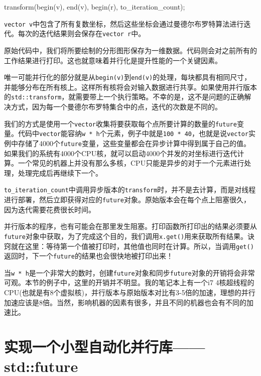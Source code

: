 \begin{codebox}[cpp]
transform(begin(v), end(v), begin(r), to_iteration_count);
\end{codebox}

\texttt{vector v}中包含了所有复数坐标，然后这些坐标会通过曼德尔布罗特算法进行迭代。每次的迭代结果则会保存在\texttt{vector r}中。

原始代码中，我们将所要绘制的分形图形保存为一维数据。代码则会对之前所有的工作结果进行打印。这也就意味着并行化是提升性能的一个关键因素。

唯一可能并行化的部分就是从\texttt{begin(v)}到\texttt{end(v)}的处理，每块都具有相同尺寸，并能够分布在所有核上。这样所有核将会对输入数据进行共享。如果使用并行版本的\texttt{std::transform}，就需要带上一个执行策略。不幸的是，这不是问题的正确解决方式，因为每一个曼德尔布罗特集合中的点，迭代的次数是不同的。

我们的方式是使用一个\texttt{vector}收集将要获取每个点所要计算的数量的\texttt{future}变量。代码中\texttt{vector}能容纳\texttt{w * h}个元素，例子中就是\texttt{100 * 40}，也就是说\texttt{vector}实例中存储了4000个\texttt{future}变量，这些变量都会在异步计算中得到属于自己的值。如果我们的系统有4000个CPU核，就可以启动4000个并发的对坐标进行迭代计算。一个常见的机器上并没有那么多核，CPU只能是异步的对于一个元素进行处理，处理完成后再继续下一个。

\texttt{to\_iteration\_count}中调用异步版本的\texttt{transform}时，并不是去计算，而是对线程进行部署，然后立即获得对应的\texttt{future}对象。原始版本会在每个点上阻塞很久，因为迭代需要花费很长时间。

并行版本的程序，也有可能会在那里发生阻塞。打印函数所打印出的结果必须要从\texttt{future}对象中获取，为了完成这个目的，我们调用\texttt{x.get()}用来获取所有结果。诀窍就在这里：等待第一个值被打印时，其他值也同时在计算。所以，当调用\texttt{get()}返回时，下一个\texttt{future}的结果也会很快地被打印出来！

当\texttt{w * h}是一个非常大的数时，创建\texttt{future}对象和同步\texttt{future}对象的开销将会非常可观。本节的例子中，这里的开销并不明显。我的笔记本上有一个i7 4核超线程的CPU(也就是有8个虚拟核)，并行版本与原始版本对比有3-5倍的加速，理想的并行加速应该是8倍。当然，影响机器的因素有很多，并且不同的机器也会有不同的加速比。


\section{实现一个小型自动化并行库——std::future}

